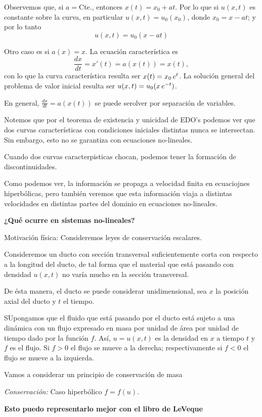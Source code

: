 Observemos que, si $a=$Cte., entonces $x(t) = x_0 + at$. Por lo que si $u(x,t)$ es constante sobre la curva, en particular $u(x,t) = u_0(x_0)$, donde $x_0 = x-at$; y por lo tanto
\[
u(x,t) = u_0(x-at)
\]

Otro caso es si $a(x)=x$. La ecuación característica es
\[
\frac{dx}{dt} = x'(t) = a(x(t)) = x(t),
\]
con lo que la curva característica resulta ser $x(t) = x_0 \thinspace e^{t}$. La solución general del problema de valor inicial resulta ser $u(x,t) = u_0(x \thinspace e^{-t})$.

En general, $\frac{dx}{dt} = a(x(t))$ se puede serolver por separación de variables.

Notemos que por el teorema de existencia y unicidad de EDO's podemos ver que dos curvas características con condiciones iniciales distintas nunca se intersectan. Sin embargo, esto no se garantiza con ecuaciones no-lineales.

Cuando dos curvas caracterpisticas chocan, podemos tener la formación de discontinuidades.

Como podemos ver, la información se propaga a velocidad finita en ecuaciojnes hiperbólicas, pero también veremos que esta información viaja a distintas velocidades en distintas partes del dominio en ecuaciones no-lineales.

\textbf{¿Qué ocurre en sistemas no-lineales?}

Motivación física: Consideremos leyes de conservación escalares.

Consideremos un ducto con sección transversal suficientemente corta con respecto a la longitud del ducto, de tal forma que el material que está pasando con densidad $u(x,t)$ no varía mucho en la sección transversal.

De ésta manera, el ducto se puede considerar unidimensional, sea $x$ la posición axial del ducto y $t$ el tiempo.

SUpongamos que el fluido que está pasando por el ducto está sujeto a una dinámica con un flujo expresado en masa por unidad de área por unidad de tiempo dado por la función $f$. Así, $u = u(x,t)$ es la densidad en $x$ a tiempo $t$ y $
f$ es el flujo. Si $f>0$ el flujo se mueve a la derecha; respectivamente si $f<0$ el flujo se mueve a la izquierda.

Vamos a considerar un principio de conservación de masa

\textit{Conservación: } Caso hiperbólico $f = f(u)$.

\textbf{Esto puedo representarlo mejor con el libro de LeVeque}

